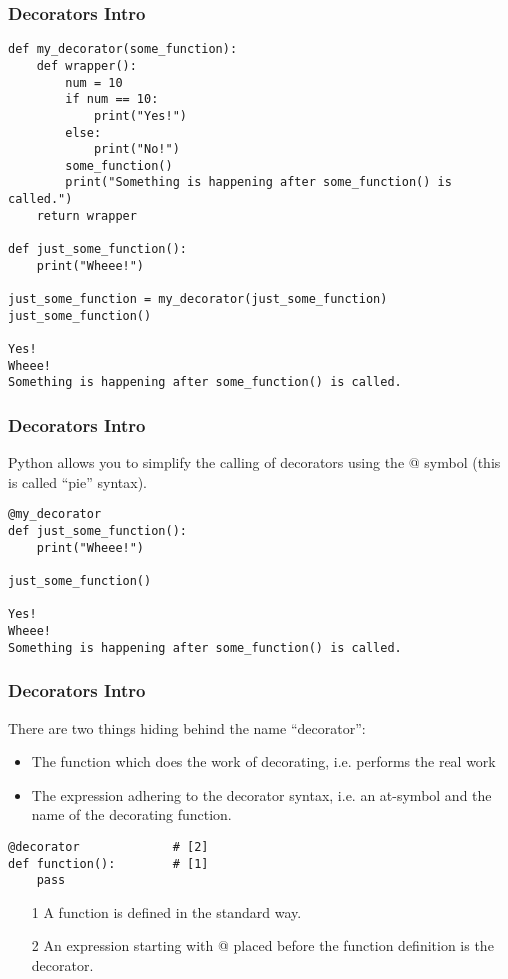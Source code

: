 \begin{frame}[fragile]\frametitle{Decorators Intro}
        \begin{lstlisting}
def my_decorator(some_function):
    def wrapper():
        num = 10
        if num == 10:
            print("Yes!")
        else:
            print("No!")
        some_function()
        print("Something is happening after some_function() is called.")
    return wrapper

def just_some_function():
    print("Wheee!")

just_some_function = my_decorator(just_some_function)
just_some_function()

Yes!
Wheee!
Something is happening after some_function() is called.
\end{lstlisting}
\end{frame}

\begin{frame}[fragile]\frametitle{Decorators Intro}
Python allows you to simplify the calling of decorators using the @ symbol (this is called “pie” syntax).
        \begin{lstlisting}
@my_decorator
def just_some_function():
    print("Wheee!")

just_some_function()

Yes!
Wheee!
Something is happening after some_function() is called.
\end{lstlisting}
\end{frame}

\begin{frame}[fragile]\frametitle{Decorators Intro}
There are two things hiding behind the name ``decorator'':
    \begin{itemize}
    \item The function which does the work of decorating, i.e. performs the real work
    \item The expression adhering to the decorator syntax, i.e. an at-symbol and the name of the decorating function.
    \end{itemize}
        \begin{lstlisting}
@decorator             # [2]
def function():        # [1]
    pass
\end{lstlisting}
    \begin{itemize}
    \item [1] A function is defined in the standard way.
    \item [2] An expression starting with @ placed before the function definition is the decorator.
    \end{itemize}
\end{frame}

